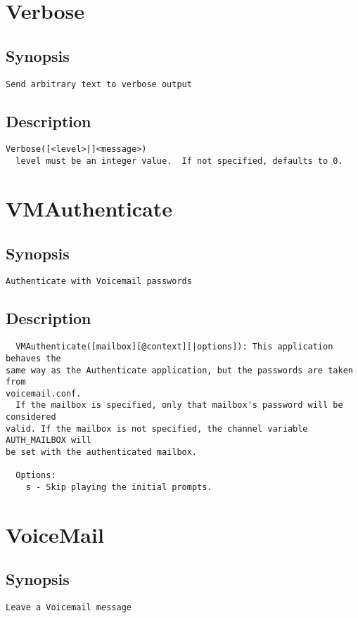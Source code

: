 \section{Verbose}
\subsection{Synopsis}
\begin{verbatim}
Send arbitrary text to verbose output
\end{verbatim}
\subsection{Description}
\begin{verbatim}
Verbose([<level>|]<message>)
  level must be an integer value.  If not specified, defaults to 0.

\end{verbatim}


\section{VMAuthenticate}
\subsection{Synopsis}
\begin{verbatim}
Authenticate with Voicemail passwords
\end{verbatim}
\subsection{Description}
\begin{verbatim}
  VMAuthenticate([mailbox][@context][|options]): This application behaves the
same way as the Authenticate application, but the passwords are taken from
voicemail.conf.
  If the mailbox is specified, only that mailbox's password will be considered
valid. If the mailbox is not specified, the channel variable AUTH_MAILBOX will
be set with the authenticated mailbox.

  Options:
    s - Skip playing the initial prompts.

\end{verbatim}


\section{VoiceMail}
\subsection{Synopsis}
\begin{verbatim}
Leave a Voicemail message
\end{verbatim}
